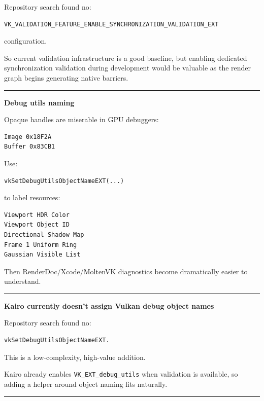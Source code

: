 Repository search found no:

\begin{verbatim}
VK_VALIDATION_FEATURE_ENABLE_SYNCHRONIZATION_VALIDATION_EXT
\end{verbatim}

configuration.

So current validation infrastructure is a good baseline, but enabling dedicated synchronization validation during development would be valuable as the render graph begins generating native barriers.

\begin{center}\rule{0.5\linewidth}{0.5pt}\end{center}

\textbf{Debug utils naming}

Opaque handles are miserable in GPU debuggers:

\begin{verbatim}
Image 0x18F2A
Buffer 0x83CB1
\end{verbatim}

Use:

\begin{verbatim}
vkSetDebugUtilsObjectNameEXT(...)
\end{verbatim}

to label resources:

\begin{verbatim}
Viewport HDR Color
Viewport Object ID
Directional Shadow Map
Frame 1 Uniform Ring
Gaussian Visible List
\end{verbatim}

Then RenderDoc/Xcode/MoltenVK diagnostics become dramatically easier to understand.

\begin{center}\rule{0.5\linewidth}{0.5pt}\end{center}

\textbf{Kairo currently doesn't assign Vulkan debug object names}

Repository search found no:

\begin{verbatim}
vkSetDebugUtilsObjectNameEXT.
\end{verbatim}

This is a low-complexity, high-value addition.

Kairo already enables \texttt{VK\_EXT\_debug\_utils} when validation is available, so adding a helper around object naming fits naturally.

\begin{center}\rule{0.5\linewidth}{0.5pt}\end{center}

